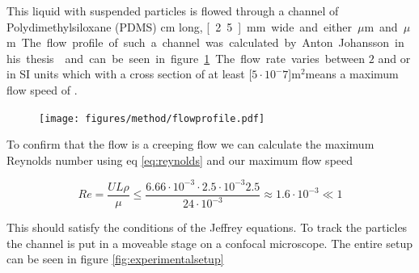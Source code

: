 This liquid with suspended particles is flowed through a channel of Polydimethylsiloxane (PDMS) \unit[4]{cm} long,
 \unit[2.5]{mm} wide and either \unit[200]{$\mu$m} and \unit[500]{$\mu$m}. The flow profile of such a channel was 
 calculated by Anton Johansson in his thesis\cite{AntonThesis} and can be seen in figure \ref{fig:flowprofile}. The 
 flow rate varies  between $2$ and  or in SI units  
 which with a cross section of at least \unit[$5\cdot 10^-7$]{m$^2$}means a maximum flow speed of  
 .

\begin{figure}[H]
\begin{center}
\texttt{[image: figures/method/flowprofile.pdf]}
\end{center}
\caption{}
\label{fig:flowprofile}
\end{figure}

            
To confirm that the flow is a creeping flow we can calculate the maximum Reynolds number using eq \ref{eq:reynolds} and our maximum flow speed 

\begin{equation}
Re = \frac{U L \rho}{\mu} 
\leq \frac{6.66\cdot 10^{-3} \cdot 2.5 \cdot 10^{-3} 2.5 }{24 \cdot 10^{-3}} 
\approx	 	1.6  \cdot 10^{-3} \ll 1
\end{equation}

This should satisfy the conditions of the Jeffrey equations. To track the particles the channel is put in a moveable stage on a confocal microscope. The entire setup can be seen in figure \ref{fig:experimentalsetup}

